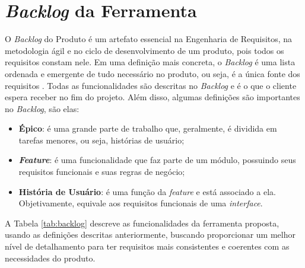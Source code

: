 \chapter{\textit{Backlog} da Ferramenta}

\label{ap:backlog}

O \textit{Backlog} do Produto é um artefato essencial na Engenharia de Requisitos, na metodologia ágil e no ciclo de desenvolvimento de um produto, pois todos os requisitos constam nele. Em uma definição mais concreta, o \textit{Backlog} é uma lista ordenada e emergente de tudo necessário no produto, ou seja, é a única fonte dos requisitos \cite{carolipaulo2021}. Todas as funcionalidades são descritas no \textit{Backlog} e é o que o cliente espera receber no fim do projeto. Além disso, algumas definições são importantes no \textit{Backlog}, são elas:

\begin{itemize}
    \item \textbf{Épico}: é uma grande parte de trabalho que, geralmente, é dividida em tarefas menores, ou seja, histórias de usuário;
    \item \textit{\textbf{Feature}}: é uma funcionalidade que faz parte de um módulo, possuindo seus requisitos funcionais e suas regras de negócio;
    \item \textbf{História de Usuário}: é uma função da \textit{feature} e está associado a ela. Objetivamente, equivale aos requisitos funcionais de uma \textit{interface}.
\end{itemize}

A Tabela \ref{tab:backlog} descreve as funcionalidades da ferramenta proposta, usando as definições descritas anteriormente, buscando proporcionar um melhor nível de detalhamento para ter requisitos mais consistentes e coerentes com as necessidades do produto.


